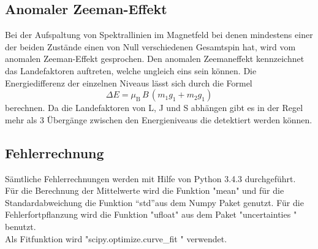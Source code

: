 \subsection{Anomaler Zeeman-Effekt}
Bei der Aufspaltung von Spektrallinien im Magnetfeld bei denen mindestens einer der beiden Zustände einen von Null verschiedenen Gesamtspin hat, wird vom anomalen Zeeman-Effekt gesprochen. Den anomalen Zeemaneffekt kennzeichnet das Landefaktoren auftreten, welche ungleich eins sein können. Die Energiedifferenz der einzelnen Niveaus lässt sich durch die Formel
\begin{equation}
  \Delta E = \mu_\text{B}\,B\,(m_1 g_1 + m_2 g_1)
  \label{eqn:dE}
\end{equation}
berechnen. Da die Landefaktoren von L, J und S abhängen gibt es in der Regel mehr als 3 Übergänge zwischen den Energieniveaus die detektiert werden können.

\subsection{Fehlerrechnung}
Sämtliche Fehlerrechnungen werden mit Hilfe von Python 3.4.3 durchgeführt. \\
Für die Berechnung der Mittelwerte wird die Funktion "mean" und für die Standardabweichung die Funktion ``std''aus dem Numpy Paket genutzt. Für die Fehlerfortpflanzung wird die Funktion "ufloat" aus dem Paket "uncertainties \cite{uncertainties}" benutzt. \\
Als Fitfunktion wird "scipy.optimize.curve\_fit \cite{scipy}" verwendet.
